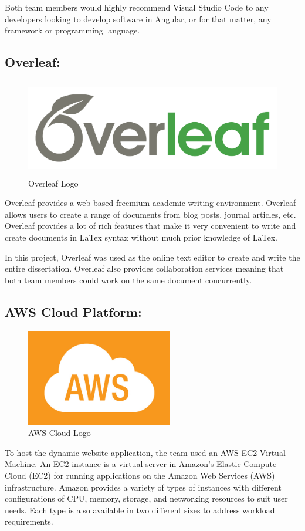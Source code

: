 Both team members would highly recommend Visual Studio Code to any developers looking to develop software in Angular, or for that matter, any framework or programming language. 

\subsection{Overleaf:}
\label{sec:TechnologyReviewOverleaf}
\begin{figure}[H]
    \centering
    \includegraphics[width=\textwidth, height=120pt]{img/overleafLogo.png}
    \caption{Overleaf Logo}
    \label{fig:my_label}
\end{figure}

Overleaf provides a web-based freemium academic writing environment. Overleaf allows users to create a range of documents from blog posts, journal articles, etc. Overleaf provides a lot of rich features that make it very convenient to write and create documents in LaTex syntax without much prior knowledge of LaTex.

\bigskip

In this project, Overleaf was used as the online text editor to create and write the entire dissertation. Overleaf also provides collaboration services meaning that both team members could work on the same document concurrently.


\subsection{AWS Cloud Platform:}
\label{sec:TechnologyReviewAWS}

\begin{figure}[H]
    \centering
    \includegraphics[width=\textwidth, height=120pt]{img/awsLogo.PNG}
    \caption{AWS Cloud Logo}
    \label{fig:my_label}
\end{figure}
To host the dynamic website application, the team used an AWS EC2 Virtual Machine. An EC2 instance is a virtual server in Amazon’s Elastic Compute Cloud (EC2) for running applications on the Amazon Web Services (AWS) infrastructure. Amazon provides a variety of types of instances with different configurations of CPU, memory, storage, and networking resources to suit user needs. Each type is also available in two different sizes to address workload requirements.

